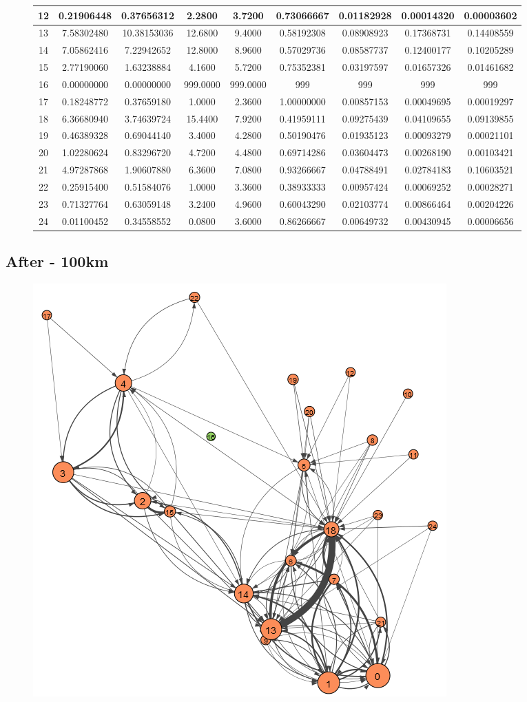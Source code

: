 \documentclass[12pt,a4paper]{thesis}
\begin{document}
\begin{figure}[H]
\begin{tabular}{|c|c|c|c|c|c|c|c|c|}
\hline	12	&	0.21906448	&	0.37656312	&	2.2800	&	3.7200	&	0.73066667	&	0.01182928	&	0.00014320	&	0.00003602	\\
\hline	13	&	7.58302480	&	10.38153036	&	12.6800	&	9.4000	&	0.58192308	&	0.08908923	&	0.17368731	&	0.14408559	\\
\hline	14	&	7.05862416	&	7.22942652	&	12.8000	&	8.9600	&	0.57029736	&	0.08587737	&	0.12400177	&	0.10205289	\\
\hline	15	&	2.77190060	&	1.63238884	&	4.1600	&	5.7200	&	0.75352381	&	0.03197597	&	0.01657326	&	0.01461682	\\
\hline	16	&	0.00000000	&	0.00000000	&	999.0000	&	999.0000	&	999	&	999	&	999	&	999	\\
\hline	17	&	0.18248772	&	0.37659180	&	1.0000	&	2.3600	&	1.00000000	&	0.00857153	&	0.00049695	&	0.00019297	\\
\hline	18	&	6.36680940	&	3.74639724	&	15.4400	&	7.9200	&	0.41959111	&	0.09275439	&	0.04109655	&	0.09139855	\\
\hline	19	&	0.46389328	&	0.69044140	&	3.4000	&	4.2800	&	0.50190476	&	0.01935123	&	0.00093279	&	0.00021101	\\
\hline	20	&	1.02280624	&	0.83296720	&	4.7200	&	4.4800	&	0.69714286	&	0.03604473	&	0.00268190	&	0.00103421	\\
\hline	21	&	4.97287868	&	1.90607880	&	6.3600	&	7.0800	&	0.93266667	&	0.04788491	&	0.02784183	&	0.10603521	\\
\hline	22	&	0.25915400	&	0.51584076	&	1.0000	&	3.3600	&	0.38933333	&	0.00957424	&	0.00069252	&	0.00028271	\\
\hline	23	&	0.71327764	&	0.63059148	&	3.2400	&	4.9600	&	0.60043290	&	0.02103774	&	0.00866464	&	0.00204226	\\
\hline	24	&	0.01100452	&	0.34558552	&	0.0800	&	3.6000	&	0.86266667	&	0.00649732	&	0.00430945	&	0.00006656	\\
\hline 
\end{tabular} 
\end{figure}

\subsection{After - 100km}

\begin{figure}[H]
\centering
\includegraphics[width=0.35\linewidth]{./AfterViz/ariadne100}
\caption{}
\label{fig:ariadneA100}
\end{figure}
\end{document}
